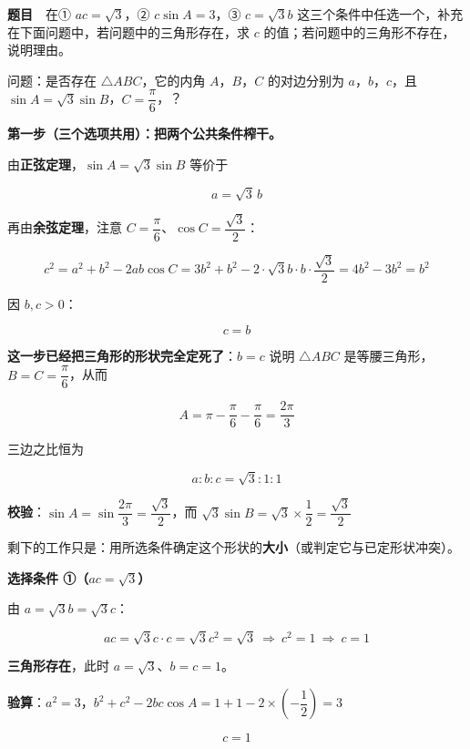 \par\medskip



\textbf{题目}　在① $ac=\sqrt3$，② $c\sin A=3$，③ $c=\sqrt3b$ 这三个条件中任选一个，补充在下面问题中，若问题中的三角形存在，求 $c$ 的值；若问题中的三角形不存在，说明理由。

问题：是否存在 $\triangle ABC$，它的内角 $A$，$B$，$C$ 的对边分别为 $a$，$b$，$c$，且 $\sin A=\sqrt3\sin B$，$C=\dfrac\pi6$，\gkblank{}？

\par\medskip

\textbf{第一步（三个选项共用）：把两个公共条件榨干。}

由\textbf{正弦定理}，$\sin A=\sqrt3\sin B$ 等价于

\[a=\sqrt3\,b\]

再由\textbf{余弦定理}，注意 $C=\dfrac\pi6$、$\cos C=\dfrac{\sqrt3}2$：

\[c^{2}=a^{2}+b^{2}-2ab\cos C=3b^{2}+b^{2}-2\cdot\sqrt3b\cdot b\cdot\frac{\sqrt3}2=4b^{2}-3b^{2}=b^{2}\]

因 $b,c>0$：

\[\boxed{c=b}\]

\textbf{这一步已经把三角形的形状完全定死了}：$b=c$ 说明 $\triangle ABC$ 是等腰三角形，$B=C=\dfrac\pi6$，从而

\[A=\pi-\frac\pi6-\frac\pi6=\frac{2\pi}3\]

三边之比恒为

\[a:b:c=\sqrt3:1:1\]

\textbf{校验}：$\sin A=\sin\dfrac{2\pi}3=\dfrac{\sqrt3}2$，而 $\sqrt3\sin B=\sqrt3\times\dfrac12=\dfrac{\sqrt3}2$ 

剩下的工作只是：用所选条件确定这个形状的\textbf{大小}（或判定它与已定形状冲突）。

\par\medskip

\textbf{选择条件 ①（$ac=\sqrt3$）}

由 $a=\sqrt3b=\sqrt3c$：

\[ac=\sqrt3c\cdot c=\sqrt3c^{2}=\sqrt3\ \Longrightarrow\ c^{2}=1\ \Longrightarrow\ c=1\]

\textbf{三角形存在}，此时 $a=\sqrt3$、$b=c=1$。

\textbf{验算}：$a^{2}=3$，$b^{2}+c^{2}-2bc\cos A=1+1-2\times\left(-\dfrac12\right)=3$ 

\[\boxed{c=1}\]

\par\medskip

